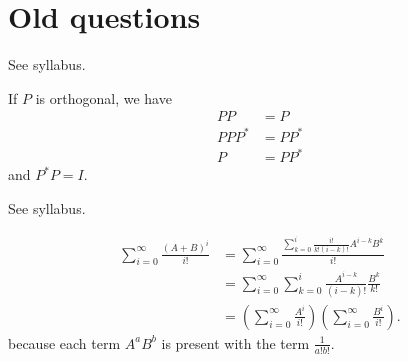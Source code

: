 \section{Old questions}

\begin{solution}
	See syllabus.
	
	If $P$ is orthogonal, we have
	\begin{align*}
	PP & = P\\
	PPP^* & = PP^*\\
	P & = PP^*
	\end{align*}
	and $P^*P = I$.
\end{solution}

\begin{solution}
	See syllabus.
	
	\begin{align*}
	\sum_{i=0}^\infty \frac{(A+B)^i}{i!}
	& = \sum_{i=0}^\infty \frac{\sum_{k=0}^i \frac{i!}{k!(i-k)!} A^{i-k}B^k}{i!}\\
	& = \sum_{i=0}^\infty \sum_{k=0}^i \frac{A^{i-k}}{(i-k)!} \frac{B^k}{k!}\\
	& =
	\left(\sum_{i=0}^\infty \frac{A^i}{i!}\right)
	\left(\sum_{i=0}^\infty \frac{B^i}{i!}\right).
	\end{align*}
	because each term $A^aB^b$ is present with the term $\frac{1}{a!b!}$.
\end{solution}

